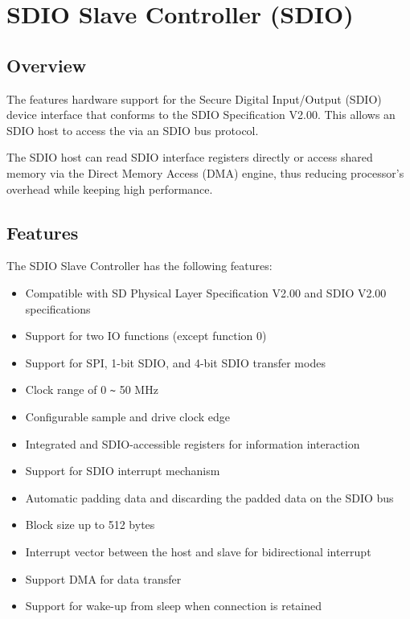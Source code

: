 \documentclass[main\_\_EN.tex]{subfiles}
\begin{document}

\ifglobal
\else
    {\let\clearpage\relax \listoftodos}
    {\let\clearpage\relax \listofdonetodos}
    \tableofcontents
\fi



\hypertarget{sdioslave}{}
\chapter{SDIO Slave Controller (SDIO)}
\label{mod:sdioslave}

\section{Overview}


The \chipname{} features hardware support for the Secure Digital Input/Output (SDIO) device interface that conforms to the SDIO Specification V2.00. This allows an SDIO host to access the \chipname{} via an SDIO bus protocol. 
   
The SDIO host can read \chipname{} SDIO interface registers directly or access shared memory via the Direct Memory Access (DMA) engine, thus reducing processor's overhead while keeping high performance.


\section{Features}

The SDIO Slave Controller has the following features:
\begin{itemize}
    \item Compatible with SD Physical Layer Specification V2.00 and SDIO V2.00 specifications
    \item Support for two IO functions (except function 0)
    \item Support for SPI, 1-bit SDIO, and 4-bit SDIO transfer modes
    \item Clock range of 0 \verb+~+ 50 MHz
    \item Configurable sample and drive clock edge
    \item Integrated and SDIO-accessible registers for information interaction
    \item Support for SDIO interrupt mechanism
    \item Automatic padding data and discarding the padded data on the SDIO bus
    \item Block size up to 512 bytes
    \item Interrupt vector between the host and slave for bidirectional interrupt
    \item Support DMA for data transfer
    \item Support for wake-up from sleep when connection is retained
\end{itemize}
\end{document}
